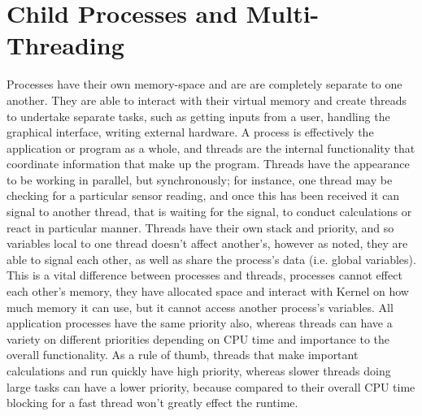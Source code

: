 \documentclass[12pt,openany,a4paper]{book}
\begin{document}
\section{Child Processes and Multi-Threading}
Processes have their own memory-space and are are completely separate to one another. They are able to interact with their virtual memory and create threads to undertake separate tasks, such as getting inputs from a user, handling the graphical interface, writing external hardware. A process is effectively the application or program as a whole, and threads are the internal functionality that coordinate information that make up the program. Threads have the appearance to be working in parallel, but synchronously; for instance, one thread may be checking for a particular sensor reading, and once this has been received it can signal to another thread, that is waiting for the signal, to conduct calculations or react in particular manner. Threads have their own stack and priority, and so variables local to one thread doesn't affect another's, however as noted, they are able to signal each other, as well as share the process's data (i.e. global variables). This is a vital difference between processes and threads, processes cannot effect each other's memory, they have allocated space and interact with Kernel on how much memory it can use, but it cannot access another process's variables. All application processes have the same priority also, whereas threads can have a variety on different priorities depending on CPU time and importance to the overall functionality. As a rule of thumb, threads that make important calculations and run quickly have high priority, whereas slower threads doing large tasks can have a lower priority, because compared to their overall CPU time blocking for a fast thread won't greatly effect the runtime.\\
\end{document}
